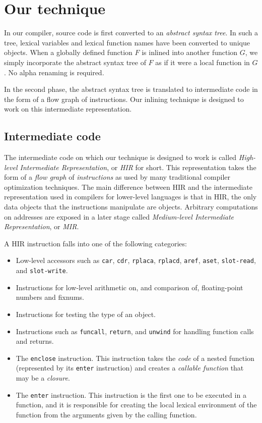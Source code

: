 \section{Our technique}

In our compiler, source code is first converted to an \emph{abstract
  syntax tree}.  In such a tree, lexical variables and lexical
function names have been converted to unique objects.  When a globally
defined function $F$ is inlined into another function $G$, we simply
incorporate the abstract syntax tree of $F$ as if it were a local
function in $G$.  No alpha renaming is required.

In the second phase, the abstract syntax tree is translated to
intermediate code in the form of a flow graph of instructions.  Our
inlining technique is designed to work on this intermediate
representation.

\subsection{Intermediate code}

The intermediate code on which our technique is designed to work is
called \emph{High-level Intermediate Representation}, or \emph{HIR}
for short.  This representation takes the form of a \emph{flow graph}
of \emph{instructions} as used by many traditional compiler
optimization techniques.  The main difference between HIR and the
intermediate representation used in compilers for lower-level
languages is that in HIR, the only data objects that the instructions
manipulate are \commonlisp{} objects.  Arbitrary computations on
addresses are exposed in a later stage called \emph{Medium-level
  Intermediate Representation}, or \emph{MIR}.

A HIR instruction falls into one of the following categories:

\begin{itemize}
\item Low-level accessors such as \texttt{car}, \texttt{cdr},
  \texttt{rplaca}, \texttt{rplacd}, \texttt{aref}, \texttt{aset},
  \texttt{slot-read}, and \texttt{slot-write}.
\item Instructions for low-level arithmetic on, and comparison of,
  floating-point numbers and fixnums.
\item Instructions for testing the type of an object.
\item Instructions such as \texttt{funcall}, \texttt{return}, and
  \texttt{unwind} for handling function calls and returns.
\item The \texttt{enclose} instruction.  This instruction takes the
  \emph{code} of a nested function (represented by its \texttt{enter}
  instruction) and creates a \emph{callable function} that may be a
  \emph{closure}.
\item The \texttt{enter} instruction.  This instruction is the first
  one to be executed in a function, and it is responsible for creating
  the local lexical environment of the function from the arguments
  given by the calling function.
\end{itemize}

